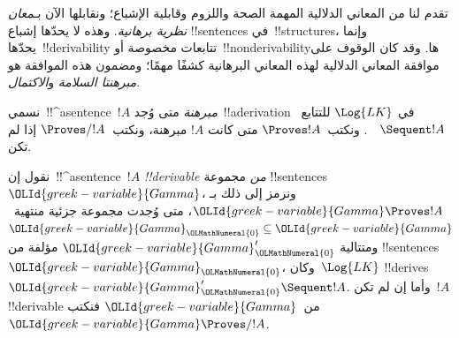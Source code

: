\documentclass[../../../include/open-logic-section]{subfiles}
\begin{document}


\begin{explain}
تقدم لنا من المعاني الدلالية المهمة الصحة واللزوم وقابلية الإشباع؛
ونقابلها الآن بـ\emph{معان نظرية برهانية}. وهذه لا يحدّها إشباع
!!{sentence}s في~!!{structure}s، وإنما يحدّها~!!{derivability} تتابعات
مخصوصة أو~!!{nonderivability}ها. وقد كان الوقوف على موافقة المعاني
الدلالية لهذه المعاني البرهانية كشفًا مهمًا؛ ومضمون هذه الموافقة هو
\emph{مبرهنتا السلامة} و\emph{الاكتمال}.
\end{explain}

\begin{defn}[المبرهنات]
نسمي~!!^a{sentence}~$!A$ \emph{مبرهنة} متى وُجد~!!a{derivation} في
$\Log{LK}$ للتتابع~$\quad \Sequent !A$. ونكتب~$\Proves !A$ متى كانت
$!A$ مبرهنة، ونكتب~$\Proves/ !A$ إذا لم تكن.
\end{defn}

\begin{defn}[!!^{derivability}]
نقول إن~!!^a{sentence}~$!A$ \emph{!!{derivable} من} مجموعة
!!{sentence}s~${\OLId{greek-variable}{Gamma}}$، ونرمز إلى ذلك بـ${\OLId{greek-variable}{Gamma}} \Proves !A$، متى
وُجدت مجموعة جزئية منتهية~${\OLId{greek-variable}{Gamma}}_{\OLMathNumeral{0}} \subseteq {\OLId{greek-variable}{Gamma}}$ ومتتالية
${\OLId{greek-variable}{Gamma}}_{\OLMathNumeral{0}}'$ مؤلفة من !!{sentence}s~${\OLId{greek-variable}{Gamma}}_{\OLMathNumeral{0}}$، وكان~$\Log{LK}$
!!{derive}s~${\OLId{greek-variable}{Gamma}}_{\OLMathNumeral{0}}' \Sequent !A$. وأما إن لم تكن~$!A$
!!{derivable} من~${\OLId{greek-variable}{Gamma}}$ فنكتب~${\OLId{greek-variable}{Gamma}} \Proves/ !A$.
\end{defn}
\end{document}
